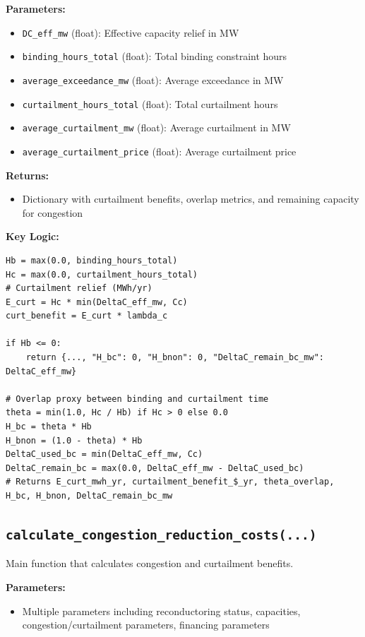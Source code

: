 \documentclass[ctcc_full_documentation.tex]{subfiles}
\begin{document}
\textbf{Parameters:}
\begin{itemize}
    \item \texttt{DC\_eff\_mw} (float): Effective capacity relief in MW
    \item \texttt{binding\_hours\_total} (float): Total binding constraint hours
    \item \texttt{average\_exceedance\_mw} (float): Average exceedance in MW
    \item \texttt{curtailment\_hours\_total} (float): Total curtailment hours
    \item \texttt{average\_curtailment\_mw} (float): Average curtailment in MW
    \item \texttt{average\_curtailment\_price} (float): Average curtailment price
\end{itemize}

\textbf{Returns:}
\begin{itemize}
    \item Dictionary with curtailment benefits, overlap metrics, and remaining capacity for congestion
\end{itemize}

\textbf{Key Logic:}
\begin{lstlisting}
Hb = max(0.0, binding_hours_total)
Hc = max(0.0, curtailment_hours_total)
# Curtailment relief (MWh/yr)
E_curt = Hc * min(DeltaC_eff_mw, Cc)
curt_benefit = E_curt * lambda_c

if Hb <= 0:
    return {..., "H_bc": 0, "H_bnon": 0, "DeltaC_remain_bc_mw": DeltaC_eff_mw}

# Overlap proxy between binding and curtailment time
theta = min(1.0, Hc / Hb) if Hc > 0 else 0.0
H_bc = theta * Hb
H_bnon = (1.0 - theta) * Hb
DeltaC_used_bc = min(DeltaC_eff_mw, Cc)
DeltaC_remain_bc = max(0.0, DeltaC_eff_mw - DeltaC_used_bc)
# Returns E_curt_mwh_yr, curtailment_benefit_$_yr, theta_overlap, H_bc, H_bnon, DeltaC_remain_bc_mw
\end{lstlisting}

\subsection{\texttt{calculate\_congestion\_reduction\_costs(...)}}

Main function that calculates congestion and curtailment benefits.

\textbf{Parameters:}
\begin{itemize}
    \item Multiple parameters including reconductoring status, capacities, congestion/curtailment parameters, financing parameters
\end{itemize}
\end{document}
